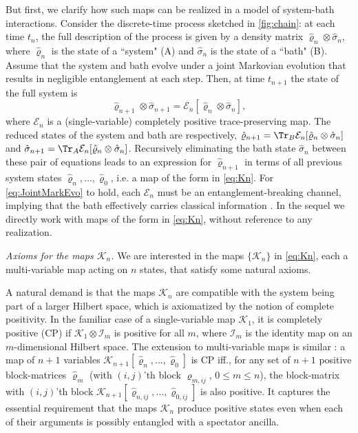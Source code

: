 \documentclass[
    11pt,
    letterpaper,
    reprint,
    notitlepage,
    superscriptaddress,
    aps,prx
]{revtex4-2}
\renewcommand{\rho}{\varrho}
\newcommand{\K}{\mathcal{K}}
\begin{document}
But first, we clarify how such maps can be realized in a model of system-bath interactions.
Consider the discrete-time process sketched in \cref{fig:chain}:
at each time $t_n$, the full description of the process is given by a density matrix 
$\hat \rho_n \otimes \hat \sigma_n$, where $\hat \rho_n$ is the state of a ``system" (A) and $\hat \sigma_n$ is the state of a ``bath" (B).
Assume that the system and bath evolve under a joint Markovian evolution that results in 
negligible entanglement at each step. 
Then, at time $t_{n+1}$ the state of the full system is
\begin{equation}\label{eq:JointMarkEvo}
	\hat \rho_{n+1} \otimes \hat \sigma_{n+1} = \mathcal{E}_n[\hat \rho_n \otimes \hat \sigma_n],
\end{equation}
where $\mathcal{E}_n$ is a (single-variable) completely positive trace-preserving map.
The reduced states of the system and bath are respectively,
$\hat \rho_{n+1} = \Tr_B \mathcal{E}_n[\hat \rho_n \otimes \hat \sigma_n]$ and $\hat \sigma_{n+1} = \Tr_A \mathcal{E}_n[\hat \rho_n \otimes \hat \sigma_n]$.
Recursively eliminating the bath state $\hat\sigma_n$ between these pair of equations leads
to an expression for $\hat \rho_{n+1}$ in terms of all previous system states $\hat \rho_n, \ldots, \hat \rho_0$, i.e. a map of the form in \cref{eq:Kn}.
For \cref{eq:JointMarkEvo} to hold, each $\mathcal{E}_n$ must be an entanglement-breaking 
channel, implying that the bath effectively carries classical information \cite{HorShoRus03}.
In the sequel we directly work with maps of the form in \cref{eq:Kn}, without reference to 
any realization.



\emph{Axioms for the maps $\mathcal{K}_n$.}
We are interested in the maps $\{\K_n\}$ in \cref{eq:Kn}, each a multi-variable map 
acting on $n$ states, that satisfy some natural axioms. 

A natural demand is that the maps $\K_n$ are compatible with the system being part of a larger Hilbert space, which is axiomatized by the notion of complete positivity. 
In the familiar case of a single-variable map $\K_1$, it is completely positive (CP) 
if $\K_1 \otimes \mathcal{I}_m$ 
is positive for all $m$, where $\mathcal{I}_m$ is the identity map on an $m$-dimensional Hilbert space. 
The extension to multi-variable maps is similar \cite{AndChoi86}: 
a map of $n+1$ variables $\K_{n+1}[\hat \rho_n, \ldots, \hat \rho_0]$ is 
CP iff., for any set of $n+1$ positive block-matrices $\hat\rho_m$ (with $(i,j)$'th block 
$\hat \rho_{m,ij}$, $0 \leq m \leq n$), the block-matrix with $(i,j)$'th block $\K_{n+1}[\hat \rho_{n,ij}, \ldots, \hat \rho_{0,ij}]$ is also positive.
It captures the essential requirement that the maps $\K_n$ produce positive states even when
each of their arguments is possibly entangled with a spectator ancilla.
\end{document}
